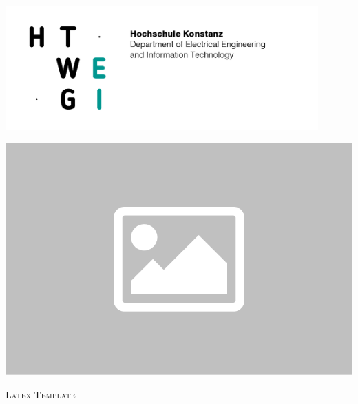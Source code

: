 \begin{titlepage}


\begin{center}

\begin{minipage}[t][3cm][b]{0.6\textwidth}
\includegraphics[width=0.9\textwidth]{figures/htwg.png}
\end{minipage}
\begin{minipage}[t][3cm][c]{0.35\textwidth}
\includegraphics[width=\textwidth]{figures/placeholder.png}
\end{minipage}


\begin{center}
\LARGE{\textsc{
  Latex Template\\
}}
\end{center}

\end{center}
\end{titlepage}